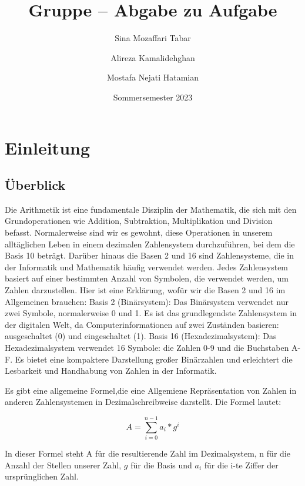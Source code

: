 \documentclass[course=erap]{aspdoc}
\author{Sina Mozaffari Tabar \and Alireza Kamalidehghan  \and Mostafa Nejati Hatamian}
\date{Sommersemester 2023} %
\title{Gruppe \theGroup{} -- Abgabe zu Aufgabe \theNumber}
\begin{document}
    \maketitle

    \section{Einleitung}
    \subsection{Überblick}
    Die Arithmetik ist eine fundamentale Disziplin der Mathematik, die sich mit den Grundoperationen wie Addition, Subtraktion, Multiplikation und Division befasst. Normalerweise sind wir es gewohnt, diese Operationen in unserem alltäglichen Leben in einem dezimalen Zahlensystem durchzuführen, bei dem die Basis 10 beträgt.
    \newline
    Darüber hinaus die Basen 2 und 16 sind Zahlensysteme, die in der Informatik und Mathematik häufig verwendet werden. Jedes Zahlensystem basiert auf einer bestimmten Anzahl von Symbolen, die verwendet werden, um Zahlen darzustellen. Hier ist eine Erklärung, wofür wir die Basen 2 und 16 im Allgemeinen brauchen:
    \newline
    \newline
    Basis 2 (Binärsystem):
    Das Binärsystem verwendet nur zwei Symbole, normalerweise 0 und 1. Es ist das grundlegendste Zahlensystem in der digitalen Welt, da Computerinformationen auf zwei Zuständen basieren: ausgeschaltet (0) und eingeschaltet (1).
    \newline
    \newline
    Basis 16 (Hexadezimalsystem):
    Das Hexadezimalsystem verwendet 16 Symbole: die Zahlen 0-9 und die Buchstaben A-F. Es bietet eine kompaktere Darstellung großer Binärzahlen und erleichtert die Lesbarkeit und Handhabung von Zahlen in der Informatik.
    \newline
    \par
    Es gibt eine allgemeine Formel,die eine Allgemiene Repräsentation von Zahlen in anderen Zahlensystemen in Dezimalschreibweise darstellt. Die Formel lautet:

    \begin{equation}
        \label{sumFormel}
        A = \sum_{i=0} ^{n-1} a_i * g^i
    \end{equation}


    In dieser Formel steht A für die resultierende Zahl im Dezimalsystem, n für die Anzahl der Stellen unserer Zahl, $g$ für die Basis und $a_i$ für die i-te Ziffer der ursprünglichen Zahl.
    \newline
\end{document}
